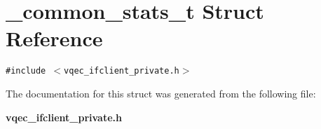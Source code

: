 \section{\_\-common\_\-stats\_\-t Struct Reference}
\label{struct__common__stats__t}
{\tt \#include $<$vqec\_\-ifclient\_\-private.h$>$}



The documentation for this struct was generated from the following file:\begin{CompactItemize}
\item 
\bf{vqec\_\-ifclient\_\-private.h}\end{CompactItemize}
